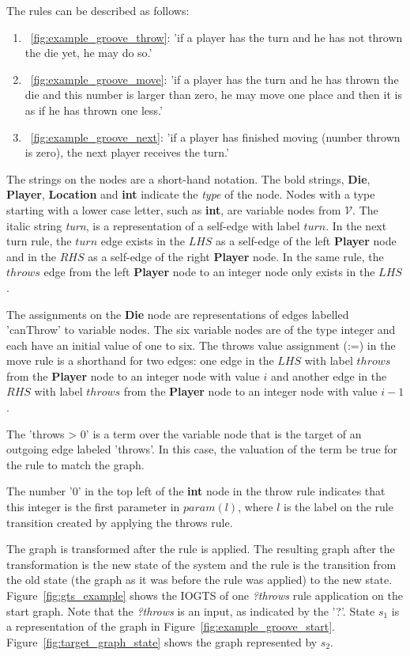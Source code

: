 The rules can be described as follows:
\begin{enumerate}
  \item~\ref{fig:example_groove_throw}: 'if a player has the turn and he has not thrown the die yet, he may do so.'
  \item~\ref{fig:example_groove_move}: 'if a player has the turn and he has thrown the die and this number is larger than zero, he may move one place and then it is as if he has thrown one less.'
  \item~\ref{fig:example_groove_next}: 'if a player has finished moving (number thrown is zero), the next player receives the turn.'
\end{enumerate}

The strings on the nodes are a short-hand notation. The bold strings, \textbf{Die}, \textbf{Player}, \textbf{Location} and \textbf{int} indicate the \textit{type} of the node. Nodes with a type starting with a lower case letter, such as \textbf{int}, are variable nodes from $\mathcal{V}$. The italic string \textit{turn}, is a representation of a self-edge with label $turn$. In the next turn rule, the $turn$ edge exists in the $\mathit{LHS}$ as a self-edge of the left \textbf{Player} node and in the $\mathit{RHS}$ as a self-edge of the right \textbf{Player} node. In the same rule, the $throws$ edge from the left \textbf{Player} node to an integer node only exists in the $\mathit{LHS}$.

The assignments on the \textbf{Die} node are representations of edges labelled 'canThrow' to variable nodes. The six variable nodes are of the type integer and each have an initial value of one to six. The throws value assignment (:=) in the move rule is a shorthand for two edges: one edge in the $\mathit{LHS}$ with label $throws$ from the \textbf{Player} node to an integer node with value $i$ and another edge in the $\mathit{RHS}$ with label $throws$ from the \textbf{Player} node to an integer node with value $i-1$. 

The 'throws > 0' is a term over the variable node that is the target of an outgoing edge labeled 'throws'. In this case, the valuation of the term be true for the rule to match the graph.

The number '0' in the top left of the \textbf{int} node in the throw rule indicates that this integer is the first parameter in $param(l)$, where $l$ is the label on the rule transition created by applying the throws rule.

The graph is transformed after the rule is applied. The resulting graph after the transformation is the new state of the system and the rule is the transition from the old state (the graph as it was before the rule was applied) to the new state. Figure~\ref{fig:gts_example} shows the IOGTS of one \textit{?throws} rule application on the start graph. Note that the \textit{?throws} is an input, as indicated by the '?'. State $s_1$ is a representation of the graph in Figure~\ref{fig:example_groove_start}. Figure~\ref{fig:target_graph_state} shows the graph represented by $s_2$.

